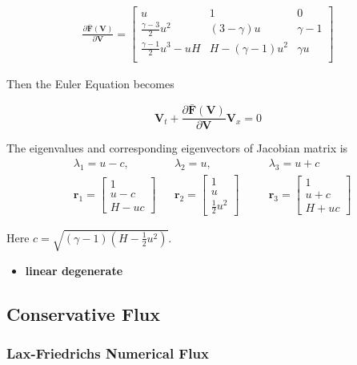 \documentclass[11pt]{diazessay} %
\begin{document}
\begin{enumerate}
    $$
    \begin{aligned}
        \frac{\partial \bar{\textbf{F}}(\textbf{V})}{\partial \textbf{V}}= \begin{bmatrix}
            u & 1 & 0 \\
            \frac{\gamma -3}{2} u^2 & (3-\gamma)u & \gamma -1\\
            \frac{\gamma -1}{2}u^3-uH & H-(\gamma -1)u^2 & \gamma u\\
        \end{bmatrix}
    \end{aligned}
    $$

    Then the Euler Equation becomes 

    $$
    \textbf{V}_t + \frac{\partial \bar{\textbf{F}}(\textbf{V})}{\partial \textbf{V}}\textbf{V}_x= 0
    $$

    The eigenvalues and corresponding eigenvectors of Jacobian matrix is
    $$
    \begin{aligned}
        & \lambda_1 = u -c, &&\lambda_2 = u,\quad && \lambda_3 = u+c\\
        &\textbf{r}_1 =\begin{bmatrix} 1 \\ u-c \\H-uc\end{bmatrix}
        &&\textbf{r}_2 =\begin{bmatrix} 1 \\ u \\ \frac{1}{2}u^2 \end{bmatrix}\quad
        &&\textbf{r}_3 =\begin{bmatrix} 1\\ u+c \\H+uc\end{bmatrix}
    \end{aligned}
    $$

    Here $c=\sqrt{(\gamma - 1)(H-\frac{1}{2}u^2)}$.    \cite{david_i_ketcheson_chapter_2020}

\end{enumerate}
\begin{itemize}
    \item \textbf{linear degenerate}
\end{itemize}



\subsection{Conservative Flux}
\subsubsection{Lax-Friedrichs Numerical Flux}
\end{document}
